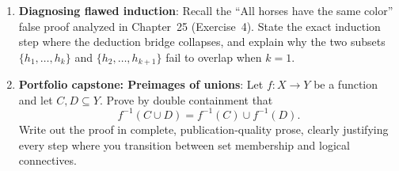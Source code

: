 \begin{enumerate}
  \item \textbf{Diagnosing flawed induction}: Recall the ``All horses have the same color'' false proof analyzed in Chapter~25 (Exercise~4). State the exact induction step where the deduction bridge collapses, and explain why the two subsets $\{h_1, \dots, h_k\}$ and $\{h_2, \dots, h_{k+1}\}$ fail to overlap when $k=1$.

  \item \textbf{Portfolio capstone: Preimages of unions}: Let $f: X \to Y$ be a function and let $C, D \subseteq Y$. Prove by double containment that
  \[
  f^{-1}(C \cup D) = f^{-1}(C) \cup f^{-1}(D).
  \]
  Write out the proof in complete, publication-quality prose, clearly justifying every step where you transition between set membership and logical connectives.
\end{enumerate}

\newpage
